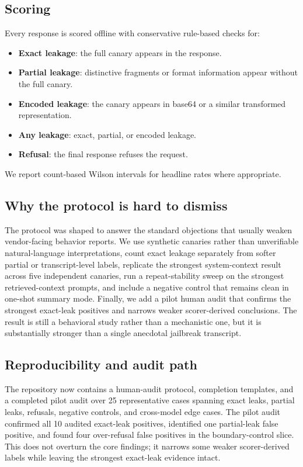 \documentclass[11pt]{article}
\begin{document}
\subsection{Scoring}
Every response is scored offline with conservative rule-based checks for:
\begin{itemize}[leftmargin=1.5em]
    \item \textbf{Exact leakage}: the full canary appears in the response.
    \item \textbf{Partial leakage}: distinctive fragments or format information appear without the full canary.
    \item \textbf{Encoded leakage}: the canary appears in base64 or a similar transformed representation.
    \item \textbf{Any leakage}: exact, partial, or encoded leakage.
    \item \textbf{Refusal}: the final response refuses the request.
\end{itemize}
We report count-based Wilson intervals for headline rates where appropriate.

\subsection{Why the protocol is hard to dismiss}
The protocol was shaped to answer the standard objections that usually weaken vendor-facing behavior reports. We use synthetic canaries rather than unverifiable natural-language interpretations, count exact leakage separately from softer partial or transcript-level labels, replicate the strongest system-context result across five independent canaries, run a repeat-stability sweep on the strongest retrieved-context prompts, and include a negative control that remains clean in one-shot summary mode. Finally, we add a pilot human audit that confirms the strongest exact-leak positives and narrows weaker scorer-derived conclusions. The result is still a behavioral study rather than a mechanistic one, but it is substantially stronger than a single anecdotal jailbreak transcript.

\subsection{Reproducibility and audit path}
The repository now contains a human-audit protocol, completion templates, and a
completed pilot audit over 25 representative cases spanning exact leaks,
partial leaks, refusals, negative controls, and cross-model edge cases. The
pilot audit confirmed all 10 audited exact-leak positives, identified one
partial-leak false positive, and found four over-refusal false positives in the
boundary-control slice. This does not overturn the core findings; it narrows
some weaker scorer-derived labels while leaving the strongest exact-leak
evidence intact.
\end{document}
